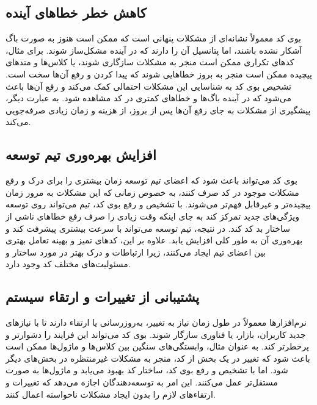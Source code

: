 \subsection{کاهش خطر خطاهای آینده}
بوی کد معمولاً نشانه‌ای از مشکلات پنهانی است که ممکن است هنوز به صورت باگ آشکار نشده باشند، اما پتانسیل آن را دارند که در آینده مشکل‌ساز شوند. برای مثال، کدهای تکراری ممکن است منجر به مشکلات سازگاری شوند، یا کلاس‌ها و متدهای پیچیده ممکن است منجر به بروز خطاهایی شوند که پیدا کردن و رفع آن‌ها سخت است. تشخیص بوی کد به شناسایی این مشکلات احتمالی کمک می‌کند و رفع آن‌ها باعث می‌شود که در آینده باگ‌ها و خطاهای کمتری در کد مشاهده شود. به عبارت دیگر، پیشگیری از مشکلات به جای رفع آن‌ها پس از بروز، از هزینه و زمان زیادی صرفه‌جویی می‌کند.
\subsection{افزایش بهره‌وری تیم توسعه}
بوی کد می‌تواند باعث شود که اعضای تیم توسعه زمان بیشتری را برای درک و رفع مشکلات موجود در کد صرف کنند، به خصوص زمانی که این مشکلات به مرور زمان پیچیده‌تر و غیرقابل فهم‌تر می‌شوند. با تشخیص و رفع بوی کد، تیم می‌تواند روی توسعه ویژگی‌های جدید تمرکز کند به جای اینکه وقت زیادی را صرف رفع خطاهای ناشی از ساختار بد کد کند. در نتیجه، تیم توسعه می‌تواند با سرعت بیشتری پیشرفت کند و بهره‌وری آن به طور کلی افزایش یابد. علاوه بر این، کدهای تمیز و بهینه تعامل بهتری بین اعضای تیم ایجاد می‌کنند، زیرا ارتباطات و درک بهتر در مورد ساختار و مسئولیت‌های مختلف کد وجود دارد.
\subsection {پشتیبانی از تغییرات و ارتقاء سیستم}
نرم‌افزارها معمولاً در طول زمان نیاز به تغییر، به‌روزرسانی یا ارتقاء دارند تا با نیازهای جدید کاربران، بازار، یا فناوری سازگار شوند. بوی کد می‌تواند این فرایند را دشوارتر و پرخطرتر کند. به عنوان مثال، وابستگی‌های سنگین بین کلاس‌ها و ماژول‌ها ممکن است باعث شود که تغییر در یک بخش از کد، منجر به مشکلات غیرمنتظره در بخش‌های دیگر شود. اما با تشخیص و رفع بوی کد، ساختار کد بهبود می‌یابد و ماژول‌ها به صورت مستقل‌تر عمل می‌کنند. این امر به توسعه‌دهندگان اجازه می‌دهد که تغییرات و ارتقاءهای لازم را بدون ایجاد مشکلات ناخواسته اعمال کنند.
\clearpage
